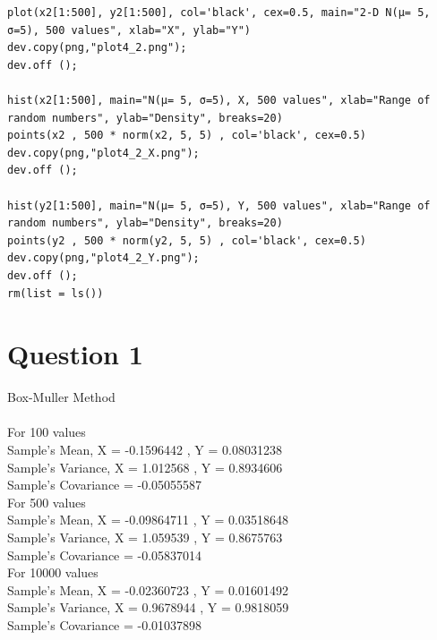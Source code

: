 \documentclass{article}
\begin{document}
\begin{lstlisting}
plot(x2[1:500], y2[1:500], col='black', cex=0.5, main="2-D N(μ= 5, σ=5), 500 values", xlab="X", ylab="Y")
dev.copy(png,"plot4_2.png");
dev.off ();

hist(x2[1:500], main="N(μ= 5, σ=5), X, 500 values", xlab="Range of random numbers", ylab="Density", breaks=20)
points(x2 , 500 * norm(x2, 5, 5) , col='black', cex=0.5)
dev.copy(png,"plot4_2_X.png");
dev.off ();

hist(y2[1:500], main="N(μ= 5, σ=5), Y, 500 values", xlab="Range of random numbers", ylab="Density", breaks=20)
points(y2 , 500 * norm(y2, 5, 5) , col='black', cex=0.5)
dev.copy(png,"plot4_2_Y.png");
dev.off ();
rm(list = ls())

\end{lstlisting}
\pagebreak


\section{Question 1}

Box-Muller Method\\\\
For 100 values\\
Sample's Mean, X =  -0.1596442 , Y =  0.08031238 \\
Sample's Variance, X =  1.012568 , Y =  0.8934606 \\
Sample's Covariance =  -0.05055587 \\

For 500 values\\
Sample's Mean, X =  -0.09864711 , Y =  0.03518648 \\
Sample's Variance, X =  1.059539 , Y =  0.8675763 \\
Sample's Covariance =  -0.05837014 \\

For 10000 values\\
Sample's Mean, X =  -0.02360723 , Y =  0.01601492 \\
Sample's Variance, X =  0.9678944 , Y =  0.9818059 \\
Sample's Covariance =  -0.01037898 \\
\end{document}
